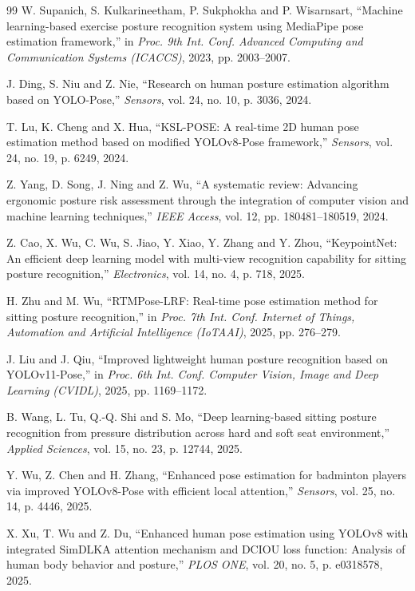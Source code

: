 ﻿\documentclass[12pt,a4paper]{article}
\begin{document}
\begin{thebibliography}{99}
W. Supanich, S. Kulkarineetham, P. Sukphokha and P. Wisarnsart, ``Machine learning-based exercise posture recognition system using MediaPipe pose estimation framework,'' in \textit{Proc. 9th Int. Conf. Advanced Computing and Communication Systems (ICACCS)}, 2023, pp. 2003--2007.

J. Ding, S. Niu and Z. Nie, ``Research on human posture estimation algorithm based on YOLO-Pose,'' \textit{Sensors}, vol. 24, no. 10, p. 3036, 2024.

T. Lu, K. Cheng and X. Hua, ``KSL-POSE: A real-time 2D human pose estimation method based on modified YOLOv8-Pose framework,'' \textit{Sensors}, vol. 24, no. 19, p. 6249, 2024.

Z. Yang, D. Song, J. Ning and Z. Wu, ``A systematic review: Advancing ergonomic posture risk assessment through the integration of computer vision and machine learning techniques,'' \textit{IEEE Access}, vol. 12, pp. 180481--180519, 2024.

Z. Cao, X. Wu, C. Wu, S. Jiao, Y. Xiao, Y. Zhang and Y. Zhou, ``KeypointNet: An efficient deep learning model with multi-view recognition capability for sitting posture recognition,'' \textit{Electronics}, vol. 14, no. 4, p. 718, 2025.

H. Zhu and M. Wu, ``RTMPose-LRF: Real-time pose estimation method for sitting posture recognition,'' in \textit{Proc. 7th Int. Conf. Internet of Things, Automation and Artificial Intelligence (IoTAAI)}, 2025, pp. 276--279.

J. Liu and J. Qiu, ``Improved lightweight human posture recognition based on YOLOv11-Pose,'' in \textit{Proc. 6th Int. Conf. Computer Vision, Image and Deep Learning (CVIDL)}, 2025, pp. 1169--1172.

B. Wang, L. Tu, Q.-Q. Shi and S. Mo, ``Deep learning-based sitting posture recognition from pressure distribution across hard and soft seat environment,'' \textit{Applied Sciences}, vol. 15, no. 23, p. 12744, 2025.

Y. Wu, Z. Chen and H. Zhang, ``Enhanced pose estimation for badminton players via improved YOLOv8-Pose with efficient local attention,'' \textit{Sensors}, vol. 25, no. 14, p. 4446, 2025.

X. Xu, T. Wu and Z. Du, ``Enhanced human pose estimation using YOLOv8 with integrated SimDLKA attention mechanism and DCIOU loss function: Analysis of human body behavior and posture,'' \textit{PLOS ONE}, vol. 20, no. 5, p. e0318578, 2025.


\end{thebibliography}
\end{document}
